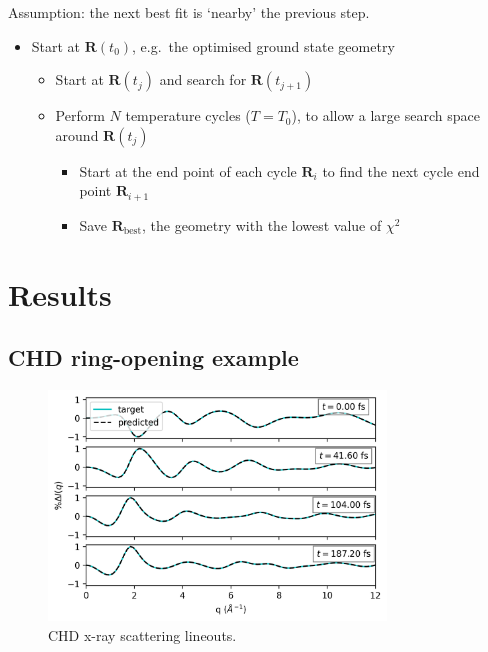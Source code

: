 \documentclass[]{article}
\newcommand{\bfR}{\textbf{R}}
\begin{document}
	Assumption: the next best fit is `nearby' the previous step.
	
	\begin{itemize}
		\item Start at $\bfR(t_0)$, e.g.\ the optimised ground state geometry
		\begin{itemize}
			\item Start at $\bfR(t_j)$ and search for $\bfR(t_{j+1})$
			\item Perform $N$ temperature cycles ($T = T_0$), to allow a large search space around $\bfR(t_j)$
			\begin{itemize}
				\item Start at the end point of each cycle $\bfR_i$ to find the next cycle end point $\bfR_{i+1}$
				\item Save $\bfR_\textrm{best}$, the geometry with the lowest value of $\chi^2$
				
			\end{itemize}
		\end{itemize}
		
	\end{itemize}
	

	
	\section{Results}

	\subsection{CHD ring-opening example}
	
	\begin{figure}[H]
	\centering
	\includegraphics[width=0.8\textwidth]{lineouts.png}
	\caption{CHD x-ray scattering lineouts.}
	\end{figure}
	
\end{document}

